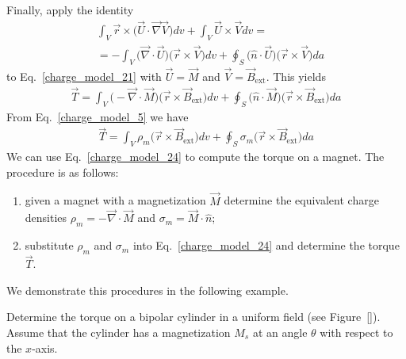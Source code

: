 \documentclass[12pt,a4paper,oneside]{book}
\begin{document}
\begin{onehalfspace}
Finally, apply the identity
\begin{equation*}\label{}
	\begin{aligned}
		& \int_{V}\vec{r}\times\Big(\vec{U}\cdot\vec{\nabla}\vec{V}\Big)dv + \int_{V} \vec{U}\times\vec{V}dv =  \\[6pt]
		&= - \int_{V} \Big(\vec{\nabla}\cdot\vec{U}\Big)\Big(\vec{r}\times\vec{V}\Big)dv+\oint_{S}\Big(\hat{n}\cdot\vec{U}\Big)\Big(\vec{r}\times\vec{V}\Big)da
	\end{aligned}
\end{equation*} 
to Eq.~\eqref{charge_model_21} with $\vec{U}=\vec{M}$ and $\vec{V}=\vec{B}_\text{ext}$. This yields
\begin{equation}\label{charge_model_23}
	{\begin{aligned}
			\vec{T} = \int_{V}\Big(-\vec{\nabla}\cdot\vec{M}\Big)\Big(\vec{r}\times\vec{B}_\text{ext}\Big)dv + \oint_{S} \Big(\hat{n}\cdot\vec{M}\Big)\Big(\vec{r}\times\vec{B}_\text{ext}\Big)da
	\end{aligned}}
\end{equation} 
From Eq.~\eqref{charge_model_5} we have
\begin{equation}\label{charge_model_24}
	\boxed{\begin{aligned}
			\vec{T} = \int_{V}\rho_m\Big(\vec{r}\times\vec{B}_\text{ext}\Big)dv + \oint_{S} \sigma_m\Big(\vec{r}\times\vec{B}_\text{ext}\Big)da
	\end{aligned}}
\end{equation} 
We can use Eq.~\eqref{charge_model_24} to compute the torque on a magnet. The procedure is as follows:
\begin{enumerate}
	\item given a magnet with a magnetization $\vec{M}$ determine the equivalent charge densities $\rho_m=-\vec{\nabla}\cdot\vec{M}$ and $\sigma_m=\vec{M}\cdot\hat{n}$;
	\item substitute $\rho_m$ and $\sigma_m$ into Eq.~\eqref{charge_model_24} and determine the torque $\vec{T}$.
\end{enumerate}
We demonstrate this procedures in the following example.

\begin{example}
	Determine the torque on a bipolar cylinder in a uniform field (see Figure~\ref{}).  Assume that the cylinder has a magnetization $M_s$ at an angle $\theta$ with respect to the $x$-axis.
	

\end{example}
\end{onehalfspace}
\end{document}
